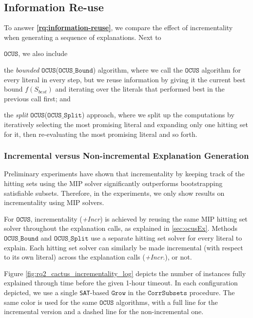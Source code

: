 \documentclass[twoside,11pt]{article}
\newcommand\m[1]{\mathcal{#1}}
\newcommand\comment[1]{\marginpar{\tiny #1}}
\renewcommand\comment[1]{#1}
\newcommand{\newtext}[1]{{\comment{{\color{blue} #1}}}}
\newcommand\mm[1]{\ensuremath{#1}\xspace}
\newcommand\call[1]{\mm{\texttt{#1}}}
\newcommand\sat{\texttt{{SAT}}\xspace}
\newcommand\grow{\mm{\call{Grow}}}
\newcommand\comus{\mm{\call{OCUS}}}
\newcommand\ousb{\mm{\call{OCUS\_Bound}}}
\newcommand\ousbiter{\mm{\call{OCUS\_Split}}}
\newcommand\corrsubsets{\mm{\call{CorrSubsets}}}
\begin{document}
\subsection{Information Re-use}\label{sec:experiments:incrementality}

To answer \textbf{\ref{rq:information-reuse}}, we compare the effect of incrementality when generating a sequence of explanations. 
Next to \begin{inparaenum}[(1)]
	\item \comus, we also include
	\item the \emph{bounded} \comus (\ousb) algorithm, where we call the \comus algorithm for every literal in every step, but we reuse information by giving it the current best bound $f(S_{best})$ and iterating over the literals that performed best in the previous call first; and
	\item the \emph{split} \comus (\ousbiter) approach, where we split up the computations by iteratively selecting the most promising literal and expanding only one hitting set for it, then re-evaluating the most promising literal and so forth.
\end{inparaenum}

\subsubsection{Incremental versus Non-incremental Explanation Generation}

Preliminary experiments have shown that incrementality by keeping track of the hitting sets using the MIP solver significantly outperforms bootstrapping satisfiable subsets. 
Therefore, in the experiments, we only show results on incrementality using MIP solvers.%

For \comus, incrementality (\emph{+Incr}) is achieved by reusing the same MIP hitting set solver throughout the explanation calls, as explained in \cref{sec:ocusEx}.
Methods \ousb and \ousbiter use a separate hitting set solver for every literal to explain. Each hitting set solver can similarly be made incremental (with respect to its own literal) across the explanation calls (\emph{+Incr.}), or not.%

Figure \ref{fig:rq2_cactus_incrementality_log} depicts the number of instances fully explained through time before the given 1-hour timeout. In each configuration depicted, we use a single \sat-based \grow in the \corrsubsets procedure. The same color is used for the same \comus algorithms, with a full line for the incremental version and a dashed line for the non-incremental one.
\end{document}
